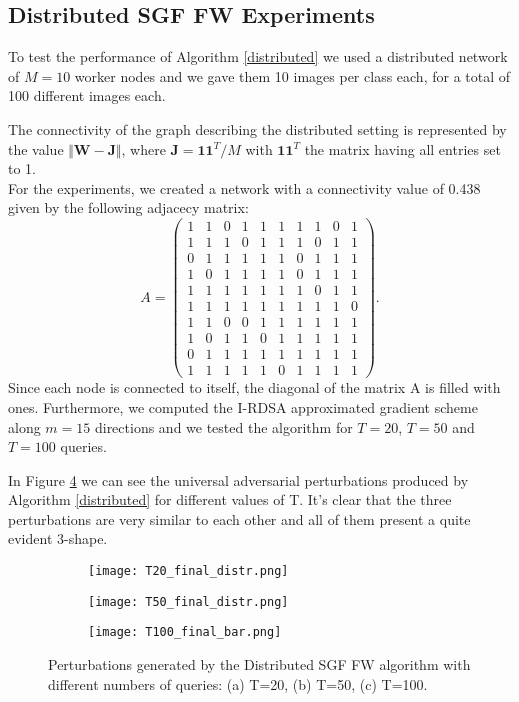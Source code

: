 \subsection{Distributed SGF FW Experiments}
To test the performance of Algorithm \ref{distributed} we used a distributed network of $M=10$ worker nodes and we
gave them 10 images per class each, for a total of 100 different images each.

The connectivity of the graph describing the distributed setting is represented by the value $\Vert \mathbf{W}- \mathbf{J} \Vert$,
where $\mathbf{J}= \mathbf{11}^T/M$ with $\mathbf{11}^T$ the matrix having all entries set to 1.\\ For the experiments, we created a network
with a connectivity value of 0.438 given by the following adjacecy
matrix:
\[ A =
\begin{pmatrix}
1& 1& 0& 1& 1& 1& 1& 1& 0& 1\\
1& 1& 1& 0& 1& 1& 1& 0& 1& 1\\
0& 1& 1& 1& 1& 1& 0& 1& 1& 1\\
1& 0& 1& 1& 1& 1& 0& 1& 1& 1\\
1& 1& 1& 1& 1& 1& 1& 0& 1& 1\\
1& 1& 1& 1& 1& 1& 1& 1& 1& 0\\
1& 1& 0& 0& 1& 1& 1& 1& 1& 1\\
1& 0& 1& 1& 0& 1& 1& 1& 1& 1\\
0& 1& 1& 1& 1& 1& 1& 1& 1& 1\\
1& 1& 1& 1& 1& 0& 1& 1& 1& 1
\end{pmatrix}
.\]
\indent Since each node is connected to itself, the diagonal of the matrix A is filled with ones.
Furthermore, we computed the I-RDSA approximated gradient scheme along $m=15$ directions and we tested the algorithm for $T=20$, $T=50$ and $T=100$ queries.

In Figure \ref{fig:perturbations} we can see the universal adversarial perturbations produced by Algorithm \ref{distributed}
for different values of T. It's clear that the three perturbations are very similar to each other and all of them present a quite evident 3-shape.
\begin{figure}[h]
	\centering
	\begin{subfigure}[b]{0.15\textwidth}
		\centering
		\texttt{[image: T20\_final\_distr.png]}
		\caption{}
		\label{fig:distributed_perturbation_20}
	\end{subfigure}
	\hfill
	\begin{subfigure}[b]{0.15\textwidth}
		\texttt{[image: T50\_final\_distr.png]}
		\caption{}
		\label{fig:variance-distributed_perturbation_50}
	\end{subfigure}
	\hfill
	\begin{subfigure}[b]{0.15\textwidth}
		\texttt{[image: T100\_final\_bar.png]}
		\caption{}
		\label{fig:distributed_perturbation_100}
	\end{subfigure}
	\caption{{\small Perturbations generated by the Distributed SGF FW algorithm with different numbers of queries: (a) T=20, (b) T=50, (c) T=100.}}
	\label{fig:perturbations}
\end{figure}


